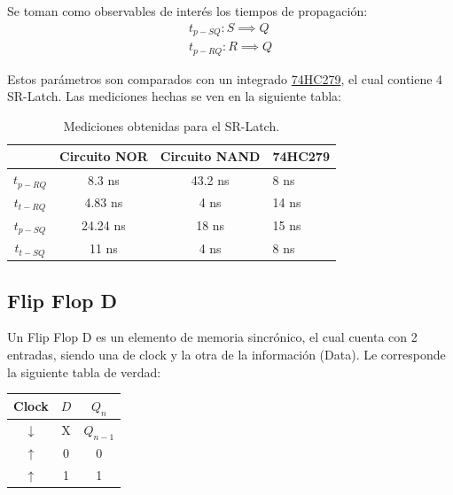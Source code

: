 Se toman como observables de interés los tiempos de propagación:
\begin{equation*}
\begin{split}
	t_{p-SQ}: S \implies Q \\
	t_{p-RQ}: R \implies Q
\end{split}
\end{equation*}

Estos parámetros son comparados con un integrado \href{http://noel.feld.cvut.cz/hw/st/1937.pdf}{74HC279}, el cual contiene 4 SR-Latch. Las mediciones hechas se ven en la siguiente tabla:
\begin{table}[H]
\centering
\begin{tabular}{cccl}
\hline
\textit{}           & \textbf{Circuito NOR} & \textbf{Circuito NAND} & \textbf{74HC279} \\ \hline
\textbf{$t_{p-RQ}$} & 8.3 ns                 & 43.2 ns                 & 8 ns              \\
\textbf{$t_{t-RQ}$} & 4.83 ns                & 4 ns                    & 14 ns             \\
\textbf{$t_{p-SQ}$} & 24.24 ns               & 18 ns                   & 15 ns             \\
\textbf{$t_{t-SQ}$} & 11 ns                  & 4 ns                    & 8 ns             \\
\hline
\end{tabular}
\caption{Mediciones obtenidas para el SR-Latch.}
\label{tab:srl}
\end{table}

\subsection{Flip Flop D}

Un Flip Flop D es un elemento de memoria sincrónico, el cual cuenta con 2 entradas, siendo una de clock y la otra de la información (Data). Le corresponde la siguiente tabla de verdad:
\begin{table}[H]
\centering
\begin{tabular}{cc|c}
\hline
\textbf{Clock} & \textbf{$D$} & \textbf{$Q_n$} \\ \hline
$\downarrow$   & X            & $Q_{n-1}$      \\
$\uparrow$     & 0            & 0              \\
$\uparrow$     & 1            & 1             \\
\hline
\end{tabular}
\end{table}

